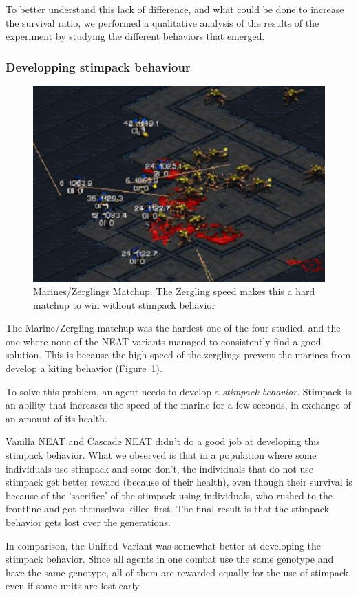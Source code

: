 To better understand this lack of difference, and what could be done
to increase the survival ratio, we performed a qualitative analysis of the
results of the experiment by studying the different behaviors that emerged.

\subsubsection{Developping stimpack behaviour}

\begin{figure}
    \includegraphics[width=.45\textwidth]{figures/marines_vs_zerglings_combat}
    \caption{Marines/Zerglings Matchup. The Zergling speed makes this
      a hard matchup to win without stimpack
      behavior}\label{fig:marines_vs_zerglings}
\end{figure}

The Marine/Zergling matchup was the hardest one of the four studied,
and the one where none of the NEAT variants managed to consistently
find a good solution. This is because the high speed of the zerglings
prevent the marines from develop a kiting behavior
(Figure~\ref{fig:marines_vs_zerglings}).

To solve this problem, an agent needs to develop a \emph{stimpack
  behavior}. Stimpack is an ability that increases the speed of the
marine for a few seconds, in exchange of an amount of its health. 

Vanilla NEAT and Cascade NEAT didn't do a good job at developing this
stimpack behavior. What we observed is that in a population where some
individuals use stimpack and some don't, the individuals that do not
use stimpack get better reward (because of their health), even though
their survival is because of the 'sacrifice' of the stimpack using
individuals, who rushed to the frontline and got themselves killed
first. The final result is that the stimpack behavior gets lost over
the generations.

In comparison, the Unified Variant was somewhat better at developing
the stimpack behavior. Since all agents in one combat use the same
genotype and have the same genotype, all of them are rewarded equally
for the use of stimpack, even if some units are lost early.

